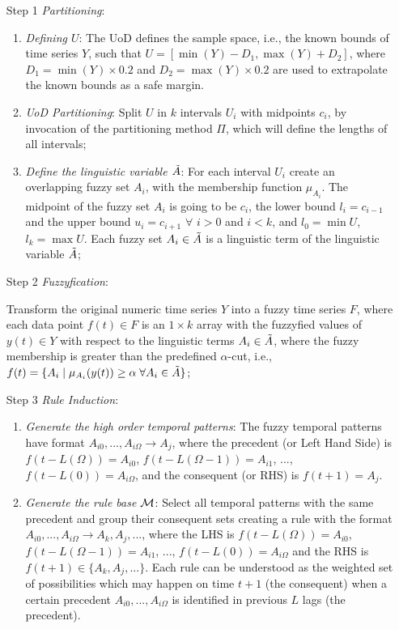 \begin{enumerate}
\item[Step 1] \textit{Partitioning}:
\begin{enumerate}
\item \textit{Defining $U$}: The UoD defines the sample space, i.e., the known bounds of time series $Y$, such that $U = [\min(Y)-D_1, \max(Y)+D_2]$, where $D_1 = \min(Y)\times 0.2$ and $D_2 = \max(Y)\times 0.2$ are used to extrapolate the known bounds as a safe margin. 

\item \textit{UoD Partitioning}: Split $U$ in $k$ intervals $U_i$ with midpoints $c_i$, by invocation of the partitioning method $\Pi$, which will define the lengths of all intervals;

\item \textit{Define the linguistic variable $\Tilde{A}$}: For each interval $U_i$ create an overlapping fuzzy set $A_i$, with the membership function $\mu_{A_i}$. The midpoint of the fuzzy set $A_i$ is going to be $c_i$, the lower bound $l_i = c_{i-1}$ and the upper bound $u_i = c_{i+1}$ $\forall$ $i >0$ and $i < k$, and $l_0 = \min U$, $l_k = \max U$. Each fuzzy set $A_i \in \Tilde{A}$ is a linguistic term of the linguistic variable $\Tilde{A}$;
\end{enumerate}

\item[Step 2] \textit{Fuzzyfication}: 

Transform the original numeric time series $Y$ into a fuzzy time series $F$, where each data point $f(t) \in F$ is an $1\times k$ array with the fuzzyfied values of $y(t) \in Y$ with respect to the linguistic terms $A_i \in \Tilde{A}$, where the fuzzy membership is greater than the predefined $\alpha$-cut, i.e., $f(t) = \{A_i\; |\; \mu_{A_i}(y(t)) \geq \alpha\;\forall A_i \in \Tilde{A}\}$;

\item[Step 3] \textit{Rule Induction}: 
\begin{enumerate}
\item \textit{Generate the high order temporal patterns}: The fuzzy temporal patterns have format $A_{i0},...,A_{i\Omega} \rightarrow A_j$, where the precedent (or Left Hand Side) is $f(t - L(\Omega)) = A_{i0}$, $f(t - L(\Omega-1)) = A_{i1}$, ..., $f(t - L(0)) = A_{i\Omega}$, and the consequent (or RHS) is $f(t+1) = A_j$.

\item \textit{Generate the rule base $\mathcal{M}$}: Select all temporal patterns with the same precedent and group their consequent sets  creating a rule with the format $A_{i0},...,A_{i\Omega} \rightarrow  A_k, A_j,...$, where the LHS is $f(t - L(\Omega)) = A_{i0}$, $f(t - L(\Omega-1)) = A_{i1}$, ..., $f(t - L(0)) = A_{i\Omega}$ and the RHS is $f(t+1) \in \{A_k, A_j,...\}$. Each rule can be understood as the weighted set of possibilities which may happen on time $t+1$ (the consequent) when a certain precedent $A_{i0},...,A_{i\Omega}$ is identified in previous $L$ lags (the precedent).
\end{enumerate}
\end{enumerate}


